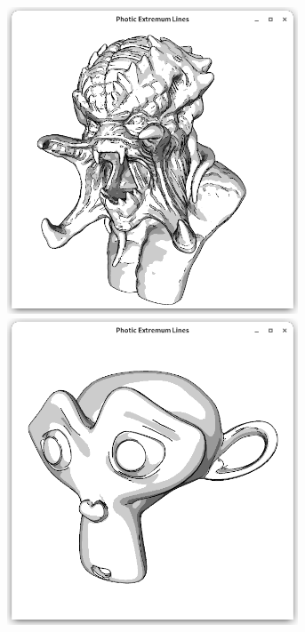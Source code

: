 \documentclass[9pt,fleqn,twoside,twocolumn]{stdglobal}
\begin{document}
\begin{figure}
\begin{subfigure}[t]{0.19\textwidth}
        \includegraphics[width=0.95\textwidth,trim={15px 15 15 50},clip]{images/results/predator-contours-pel-toon.png}
        \includegraphics[width=0.95\textwidth,trim={15px 15 15 50},clip]{images/results/suzanne-contours-pel-toon.png}

\end{subfigure}
\end{figure}
\end{document}
